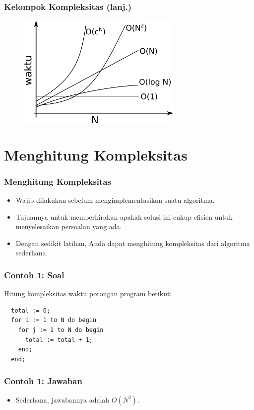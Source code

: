 \begin{frame}
\frametitle{Kelompok Kompleksitas (lanj.)}
\begin{figure}
  \includegraphics[width=8cm]{asset/grafik.png}
\end{figure}
\end{frame}

\section{Menghitung Kompleksitas}
\frame{\sectionpage}

\begin{frame}
\frametitle{Menghitung Kompleksitas}
\begin{itemize}
  \item Wajib dilakukan sebelum mengimplementasikan suatu algoritma.
  \item Tujuannya untuk memperkirakan apakah solusi ini cukup efisien untuk menyelesaikan persoalan yang ada.
  \item Dengan sedikit latihan, Anda dapat menghitung kompleksitas dari algoritma sederhana.
\end{itemize}
\end{frame}

\begin{frame}[fragile]
\frametitle{Contoh 1: Soal}
Hitung kompleksitas waktu potongan program berikut:

\hfill

\begin{lstlisting}
  total := 0;
  for i := 1 to N do begin
    for j := 1 to N do begin
      total := total + 1;
    end;
  end;
\end{lstlisting}
\end{frame}

\begin{frame}
\frametitle{Contoh 1: Jawaban}
\begin{itemize}
  \item Sederhana, jawabannya adalah $O(N^2)$.
\end{itemize}
\end{frame}


